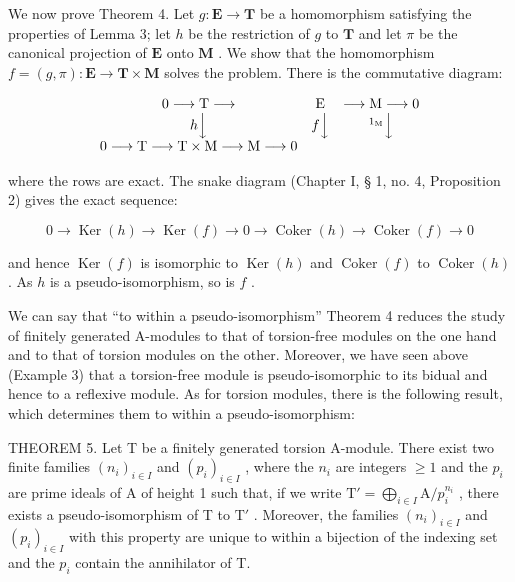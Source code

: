 We now prove Theorem 4. Let \(g: \mathbf{E} \to \mathbf{T}\) be a homomorphism satisfying the properties of Lemma 3; let \(h\) be the restriction of \(g\) to \(\mathbf{T}\) and let \(\pi\) be the canonical projection of \(\mathbf{E}\) onto \(\mathbf{M}\) . We show that the homomorphism \(f = (g, \pi): \mathbf{E} \to \mathbf{T} \times \mathbf{M}\) solves the problem. There is the commutative diagram:

\[
\begin{array}{c c c} 0 \longrightarrow \mathrm{T} \longrightarrow & \mathrm{E} & \longrightarrow \mathrm{M} \longrightarrow 0 \\ h \Big \downarrow & f \Big \downarrow & ^ {1 _ {\mathrm{M}}} \Big \downarrow \\ 0 \longrightarrow \mathrm{T} \longrightarrow \mathrm{T} \times \mathrm{M} \longrightarrow \mathrm{M} \longrightarrow 0 \end{array}
\]

where the rows are exact. The snake diagram (Chapter I, § 1, no. 4, Proposition 2) gives the exact sequence:

\[
0 \rightarrow \operatorname{Ker} (h) \rightarrow \operatorname{Ker} (f) \rightarrow 0 \rightarrow \operatorname{Coker} (h) \rightarrow \operatorname{Coker} (f) \rightarrow 0
\]

and hence \(\operatorname{Ker}(f)\) is isomorphic to \(\operatorname{Ker}(h)\) and \(\operatorname{Coker}(f)\) to \(\operatorname{Coker}(h)\) . As \(h\) is a pseudo-isomorphism, so is \(f\) .

We can say that ``to within a pseudo-isomorphism'' Theorem 4 reduces the study of finitely generated A-modules to that of torsion-free modules on the one hand and to that of torsion modules on the other. Moreover, we have seen above (Example 3) that a torsion-free module is pseudo-isomorphic to its bidual and hence to a reflexive module. As for torsion modules, there is the following result, which determines them to within a pseudo-isomorphism:

THEOREM 5. Let T be a finitely generated torsion A-module. There exist two finite families \((n_i)_{i\in I}\) and \((p_i)_{i\in I}\) , where the \(n_i\) are integers \(\geqslant 1\) and the \(p_i\) are prime ideals of A of height 1 such that, if we write \(\mathrm{T}' = \bigoplus_{i\in I} \mathrm{A} / p_i^{n_i}\) , there exists a pseudo-isomorphism of T to \(\mathrm{T}'\) . Moreover, the families \((n_i)_{i\in I}\) and \((p_i)_{i\in I}\) with this property are unique to within a bijection of the indexing set and the \(p_i\) contain the annihilator of T.

